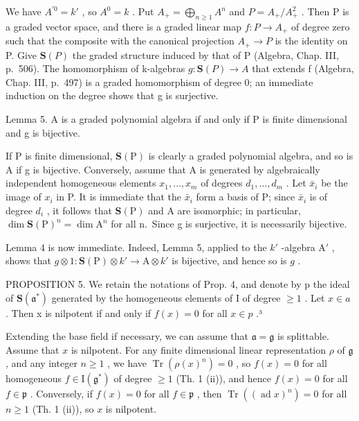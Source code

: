We have \(A^{\prime0}=k'\) , so \(A^{0}=k\) . Put \(A_{+}=\bigoplus_{n\geq1}A^{n}\) and \(P=A_{+}/A_{+}^{2}\) . Then P is a graded vector space, and there is a graded linear map \(f:P\to A_{+}\) of degree zero such that the composite with the canonical projection \(A_{+} \rightarrow P\) is the identity on P. Give \(\mathbf{S}(P)\) the graded structure induced by that of P (Algebra, Chap. III, p.~506). The homomorphism of k-algebras \(g : \mathbf{S}(P) \rightarrow A\) that extends f (Algebra, Chap. III, p.~497) is a graded homomorphism of degree 0; an immediate induction on the degree shows that g is surjective.

Lemma 5. A is a graded polynomial algebra if and only if P is finite dimensional and g is bijective.

If P is finite dimensional, \(\mathbf{S}(\mathrm{P})\) is clearly a graded polynomial algebra, and so is A if g is bijective. Conversely, assume that A is generated by algebraically independent homogeneous elements \(x_{1},\ldots,x_{m}\) of degrees \(d_{1},\ldots,d_{m}\) . Let \(\bar{x}_{i}\) be the image of \(x_{i}\) in P. It is immediate that the \(\bar{x}_{i}\) form a basis of P; since \(\bar{x}_{i}\) is of degree \(d_{i}\) , it follows that \(\mathbf{S}(\mathrm{P})\) and A are isomorphic; in particular, \(\dim\mathbf{S}(\mathrm{P})^{n}=\dim\mathrm{A}^{n}\) for all n.~Since g is surjective, it is necessarily bijective.

Lemma 4 is now immediate. Indeed, Lemma 5, applied to the \(k'\) -algebra \(\mathrm{A}'\) , shows that \(g \otimes 1: \mathbf{S}(\mathrm{P}) \otimes k' \to \mathrm{A} \otimes k'\) is bijective, and hence so is \(g\) .

PROPOSITION 5. We retain the notations of Prop. 4, and denote by p the ideal of \(\mathbf{S}(\mathfrak{a}^{*})\) generated by the homogeneous elements of I of degree \(\geq 1\) . Let \(x \in a\) . Then x is nilpotent if and only if \(f(x) = 0\) for all \(x \in p\) .³

Extending the base field if necessary, we can assume that \(\mathfrak{a} = \mathfrak{g}\) is splittable. Assume that \(x\) is nilpotent. For any finite dimensional linear representation \(\rho\) of \(\mathfrak{g}\) , and any integer \(n \geq 1\) , we have \(\operatorname{Tr}(\rho(x)^n) = 0\) , so \(f(x) = 0\) for all homogeneous \(f \in \mathrm{I}(\mathfrak{g}^*)\) of degree \(\geq 1\) (Th. 1 (ii)), and hence \(f(x) = 0\) for all \(f \in \mathfrak{p}\) . Conversely, if \(f(x) = 0\) for all \(f \in \mathfrak{p}\) , then \(\operatorname{Tr}((\operatorname{ad} x)^n) = 0\) for all \(n \geq 1\) (Th. 1 (ii)), so \(x\) is nilpotent.

